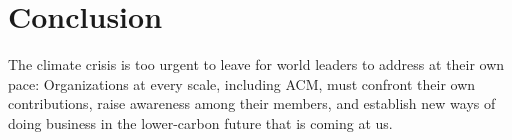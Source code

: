 \documentclass[12pt]{article}
\newcommand{\bcp}[1]{\ifdraft{\bf [bcp: #1]}\fi}
\newcommand{\mwh}[1]{\ifdraft{\bf [mwh: #1]}\fi}
\newcommand{\SECTION}{\section*}
\begin{document}
\SECTION{Conclusion}


The climate crisis is too urgent to leave for world leaders to address at
their own pace: Organizations at every scale, including ACM, must confront
their own contributions, raise awareness among their members, and establish
new ways of doing business in the lower-carbon future that is coming at us.









\end{document}
